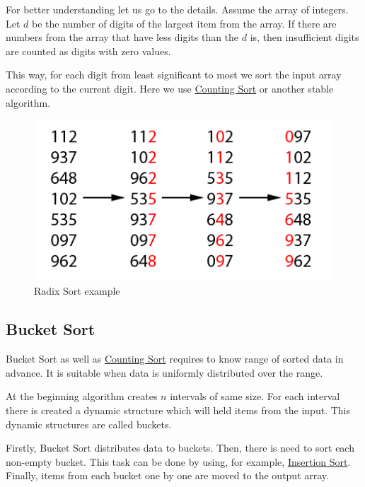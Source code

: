 \documentclass[
  field=inf,
  biblatex,
  language=english,
  glossaries,
  index
]{kidiplom}
\begin{document}
For better understanding let us go to the details. Assume the array of integers. Let $d$ be the number of digits of the largest item from the array. If there are numbers from the array that have less digits than the $d$ is, then insufficient digits are counted as digits with zero values.

This way, for each digit from least significant to most we sort the input array according to the current digit. Here we use \hyperref[sec:counting]{Counting Sort} or another stable algorithm.

\begin{figure}[H]
\begin{center}
	
	\includegraphics[scale=2]{img/Radixsort.png}
	\caption{Radix Sort example}\label{fig:radixsort}
\end{center}
\end{figure}

\subsection{Bucket Sort}

Bucket Sort as well as \hyperref[sec:counting]{Counting Sort} requires to know range of sorted data in advance. It is suitable when data is uniformly distributed over the range.

At the beginning algorithm creates $n$ intervals of same size. For each interval there is created a dynamic structure which will held items from the input. This dynamic structures are called buckets.

Firstly, Bucket Sort distributes data to buckets. Then, there is need to sort each non-empty bucket. This task can be done by using, for example, \hyperref[sec:insertion]{Insertion Sort}. Finally, items from each bucket one by one are moved to the output array.
\end{document}
